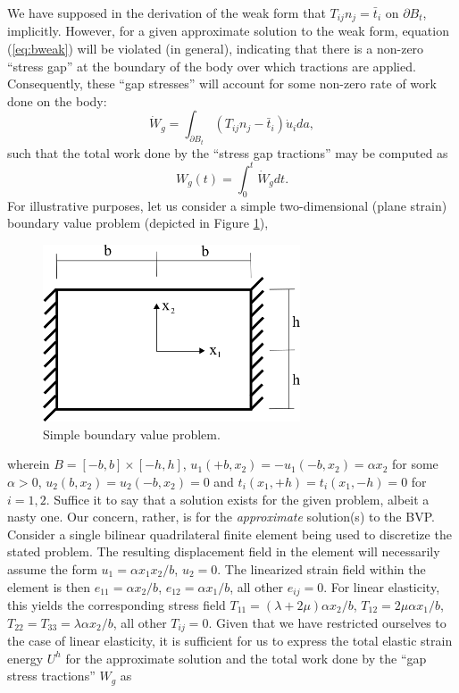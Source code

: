 \documentclass[11pt]{article} %
\begin{document}
We have supposed in the derivation of the weak form that $T_{ij} n_j = \bar{t}_i$ on $\partial B_t$, implicitly. However, for a given approximate solution to the weak form, equation (\ref{eq:bweak}) will be violated (in general), indicating that there is a non-zero ``stress gap'' at the boundary of the body over which tractions are applied. Consequently, these ``gap stresses'' will account for some non-zero rate of work done on the body:
\begin{equation}
	\dot{W}_g = \int_{\partial B_t} (T_{ij} n_j - \bar{t}_i) \dot{u}_i da,
\end{equation}
such that the total work done by the ``stress gap tractions'' may be computed as
\begin{equation}
	W_g (t) = \int_0^t \dot{W}_g dt.
\end{equation}
For illustrative purposes, let us consider a simple two-dimensional (plane strain) boundary value problem (depicted in Figure \ref{fig:simpleBVP}),
\begin{figure} [!ht]
	\centering
	\includegraphics[width = 3.0in,trim=0 0 0 0,clip=true]{simpleBVP.png}
	\caption{Simple boundary value problem.}
	\label{fig:simpleBVP}
\end{figure}
wherein $B = [-b, b] \times [-h, h]$, $u_1(+b,x_2) = - u_1(-b,x_2) = \alpha x_2$ for some $\alpha > 0$, $u_2(b,x_2) = u_2(-b,x_2) = 0$ and $t_i (x_1, +h) = t_i (x_1, -h) = 0$ for $i = 1, 2$. Suffice it to say that a solution exists for the given problem, albeit a nasty one. Our concern, rather, is for the \textit{approximate} solution(s) to the BVP. Consider a single bilinear quadrilateral finite element being used to discretize the stated problem. The resulting displacement field in the element will necessarily assume the form $u_1 = \alpha x_1 x_2 / b$, $u_2 = 0$. The linearized strain field within the element is then $e_{11} = \alpha x_2 / b$, $e_{12} = \alpha x_1 / b$, all other $e_{ij} = 0$. For linear elasticity, this yields the corresponding stress field $T_{11} = (\lambda + 2 \mu) \alpha x_2 / b$, $T_{12} = 2 \mu \alpha x_1 / b$, $T_{22} = T_{33} = \lambda \alpha x_2 / b$, all other $T_{ij} = 0$. Given that we have restricted ourselves to the case of linear elasticity, it is sufficient for us to express the total elastic strain energy $U^h$ for the approximate solution and the total work done by the ``gap stress tractions'' $W_g$ as
\end{document}
